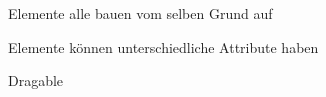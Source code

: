 \cfoot{}
Elemente alle bauen vom selben Grund auf 

Elemente können unterschiedliche Attribute haben

Dragable

